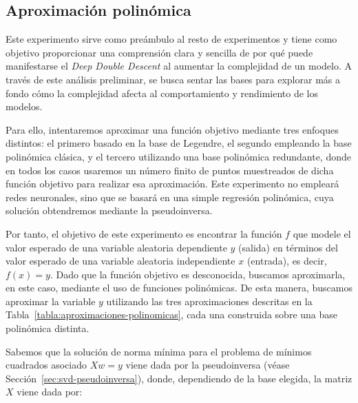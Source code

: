 \subsection{Aproximación polinómica}\label{subsec:approx-polinomica}

Este experimento sirve como preámbulo al resto de experimentos y tiene como objetivo proporcionar una comprensión clara y sencilla de por qué puede manifestarse el \textit{Deep Double Descent} al aumentar la complejidad de un modelo. A través de este análisis preliminar, se busca sentar las bases para explorar más a fondo cómo la complejidad afecta al comportamiento y rendimiento de los modelos.

Para ello, intentaremos aproximar una función objetivo mediante tres enfoques distintos: el primero basado en la base de Legendre, el segundo empleando la base polinómica clásica, y el tercero utilizando una base polinómica redundante, donde en todos los casos usaremos un número finito de puntos muestreados de dicha función objetivo para realizar esa aproximación. Este experimento no empleará redes neuronales, sino que se basará en una simple regresión polinómica, cuya solución obtendremos mediante la pseudoinversa.

Por tanto, el objetivo de este experimento es encontrar la función $f$ que modele el valor esperado de una variable aleatoria dependiente $y$ (salida) en términos del valor esperado de una variable aleatoria independiente $x$ (entrada), es decir, $f(x)=y$. Dado que la función objetivo es desconocida, buscamos aproximarla, en este caso, mediante el uso de funciones polinómicas. De esta manera, buscamos aproximar la variable $y$ utilizando las tres aproximaciones descritas en la Tabla~\ref{tabla:aproximaciones-polinomicas}, cada una construida sobre una base polinómica distinta.

Sabemos que la solución de norma mínima para el problema de mínimos cuadrados asociado $Xw=y$ viene dada por la pseudoinversa (véase Sección~\ref{sec:svd-pseudoinversa}), donde, dependiendo de la base elegida, la matriz $X$ viene dada por:

